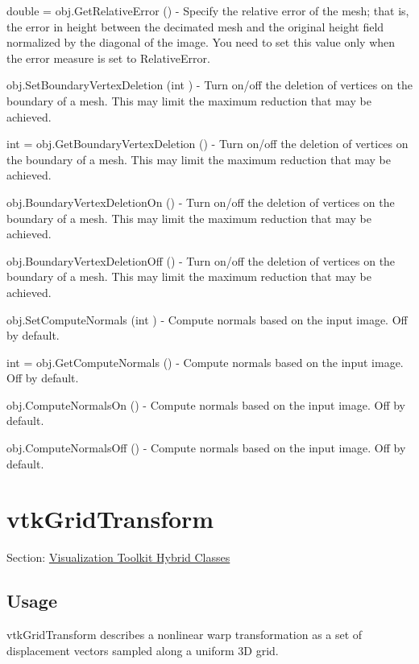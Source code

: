 \begin{DoxyItemize}
\item {\ttfamily double = obj.\-Get\-Relative\-Error ()} -\/ Specify the relative error of the mesh; that is, the error in height between the decimated mesh and the original height field normalized by the diagonal of the image. You need to set this value only when the error measure is set to Relative\-Error.  
\item {\ttfamily obj.\-Set\-Boundary\-Vertex\-Deletion (int )} -\/ Turn on/off the deletion of vertices on the boundary of a mesh. This may limit the maximum reduction that may be achieved.  
\item {\ttfamily int = obj.\-Get\-Boundary\-Vertex\-Deletion ()} -\/ Turn on/off the deletion of vertices on the boundary of a mesh. This may limit the maximum reduction that may be achieved.  
\item {\ttfamily obj.\-Boundary\-Vertex\-Deletion\-On ()} -\/ Turn on/off the deletion of vertices on the boundary of a mesh. This may limit the maximum reduction that may be achieved.  
\item {\ttfamily obj.\-Boundary\-Vertex\-Deletion\-Off ()} -\/ Turn on/off the deletion of vertices on the boundary of a mesh. This may limit the maximum reduction that may be achieved.  
\item {\ttfamily obj.\-Set\-Compute\-Normals (int )} -\/ Compute normals based on the input image. Off by default.  
\item {\ttfamily int = obj.\-Get\-Compute\-Normals ()} -\/ Compute normals based on the input image. Off by default.  
\item {\ttfamily obj.\-Compute\-Normals\-On ()} -\/ Compute normals based on the input image. Off by default.  
\item {\ttfamily obj.\-Compute\-Normals\-Off ()} -\/ Compute normals based on the input image. Off by default.  
\end{DoxyItemize}\hypertarget{vtkhybrid_vtkgridtransform}{}\section{vtk\-Grid\-Transform}\label{vtkhybrid_vtkgridtransform}
Section\-: \hyperlink{sec_vtkhybrid}{Visualization Toolkit Hybrid Classes} \hypertarget{vtkwidgets_vtkxyplotwidget_Usage}{}\subsection{Usage}\label{vtkwidgets_vtkxyplotwidget_Usage}
vtk\-Grid\-Transform describes a nonlinear warp transformation as a set of displacement vectors sampled along a uniform 3\-D grid.

